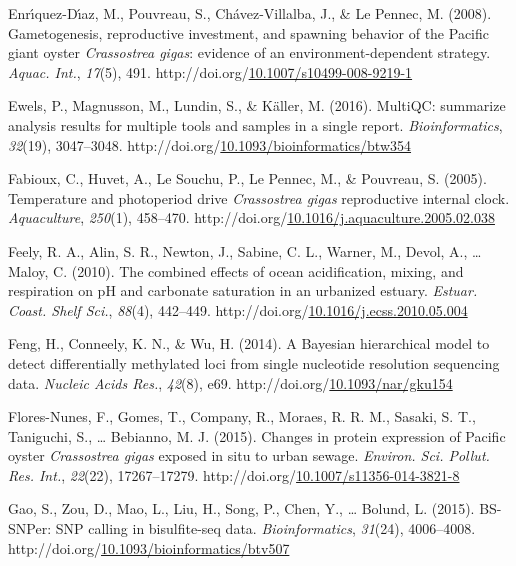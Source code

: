 \documentclass [11pt, proquest] {uwthesis}[2015/03/03]
\newlength{\cslhangindent}
\newenvironment{CSLReferences}%
{\setlength{\parindent}{0pt}%
\everypar{\setlength{\hangindent}{\cslhangindent}}\ignorespaces}%
{\par}
\begin{document}
\begin{CSLReferences}{1}{0}
\leavevmode\hypertarget{ref-Enriquez-Diaz2008}{}%
Enrı́quez-Dı́az, M., Pouvreau, S., Chávez-Villalba, J., \& Le Pennec, M. (2008). {Gametogenesis, reproductive investment, and spawning behavior of the Pacific giant oyster \emph{Crassostrea gigas}: evidence of an environment-dependent strategy}. \emph{Aquac. Int.}, \emph{17}(5), 491. http://doi.org/\href{https://doi.org/10.1007/s10499-008-9219-1}{10.1007/s10499-008-9219-1}

\leavevmode\hypertarget{ref-Ewels2016}{}%
Ewels, P., Magnusson, M., Lundin, S., \& Käller, M. (2016). {MultiQC: summarize analysis results for multiple tools and samples in a single report}. \emph{Bioinformatics}, \emph{32}(19), 3047--3048. http://doi.org/\href{https://doi.org/10.1093/bioinformatics/btw354}{10.1093/bioinformatics/btw354}

\leavevmode\hypertarget{ref-Fabioux2005}{}%
Fabioux, C., Huvet, A., Le Souchu, P., Le Pennec, M., \& Pouvreau, S. (2005). {Temperature and photoperiod drive \emph{Crassostrea gigas} reproductive internal clock}. \emph{Aquaculture}, \emph{250}(1), 458--470. http://doi.org/\href{https://doi.org/10.1016/j.aquaculture.2005.02.038}{10.1016/j.aquaculture.2005.02.038}

\leavevmode\hypertarget{ref-Feely2010}{}%
Feely, R. A., Alin, S. R., Newton, J., Sabine, C. L., Warner, M., Devol, A., \ldots{} Maloy, C. (2010). {The combined effects of ocean acidification, mixing, and respiration on pH and carbonate saturation in an urbanized estuary}. \emph{Estuar. Coast. Shelf Sci.}, \emph{88}(4), 442--449. http://doi.org/\href{https://doi.org/10.1016/j.ecss.2010.05.004}{10.1016/j.ecss.2010.05.004}

\leavevmode\hypertarget{ref-Feng2014}{}%
Feng, H., Conneely, K. N., \& Wu, H. (2014). {A Bayesian hierarchical model to detect differentially methylated loci from single nucleotide resolution sequencing data}. \emph{Nucleic Acids Res.}, \emph{42}(8), e69. http://doi.org/\href{https://doi.org/10.1093/nar/gku154}{10.1093/nar/gku154}

\leavevmode\hypertarget{ref-Flores-Nunes2015}{}%
Flores-Nunes, F., Gomes, T., Company, R., Moraes, R. R. M., Sasaki, S. T., Taniguchi, S., \ldots{} Bebianno, M. J. (2015). {Changes in protein expression of Pacific oyster \emph{Crassostrea gigas} exposed in situ to urban sewage}. \emph{Environ. Sci. Pollut. Res. Int.}, \emph{22}(22), 17267--17279. http://doi.org/\href{https://doi.org/10.1007/s11356-014-3821-8}{10.1007/s11356-014-3821-8}

\leavevmode\hypertarget{ref-Gao2015}{}%
Gao, S., Zou, D., Mao, L., Liu, H., Song, P., Chen, Y., \ldots{} Bolund, L. (2015). {BS-SNPer: SNP calling in bisulfite-seq data}. \emph{Bioinformatics}, \emph{31}(24), 4006--4008. http://doi.org/\href{https://doi.org/10.1093/bioinformatics/btv507}{10.1093/bioinformatics/btv507}


\end{CSLReferences}
\end{document}

